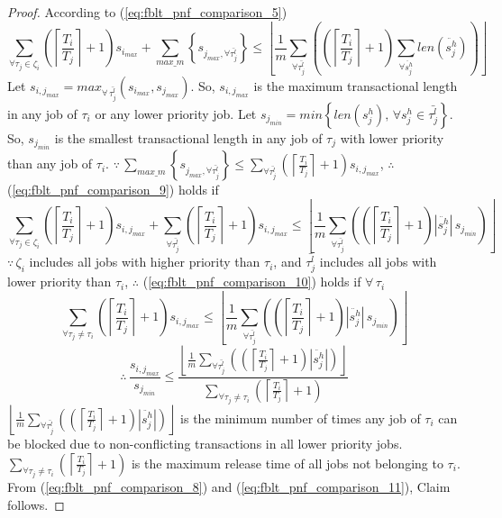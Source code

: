 \documentclass[prodmode,acmtecs]{acmsmall}
\begin{document}
\begin{compactenum}
\begin{proof}
According to (\ref{eq:fblt_pnf_comparison_5}) 
\begin{equation}
\sum_{\forall\tau_{j}\in\zeta_{i}}\left(\left\lceil \frac{T_{i}}{T_{j}}\right\rceil +1\right)s_{i_{max}}+\sum_{max\_m}\left\{ s_{j_{max},\forall\bar{\tau_{j}^{l}}}\right\} \le\left\lfloor \frac{1}{m}\sum_{\forall\bar{\tau_{j}^{l}}}\left(\left(\left\lceil \frac{T_{i}}{T_{j}}\right\rceil +1\right)\sum_{\forall\ddot{s_{j}^{h}}}len\left(\ddot{s_{j}^{h}}\right)\right)\right\rfloor \label{eq:fblt_pnf_comparison_9}
\end{equation}
Let $s_{i,j_{max}}=max_{\forall\,\bar{\tau_{j}^{l}}}(s_{i_{max}},s_{j_{max}})$.
So, $s_{i,j_{max}}$ is the maximum transactional length in any job
of $\tau_{i}$ or any lower priority job. Let $s_{j_{min}}=min\left\{ len(s_{j}^{h}),\,\forall s_{j}^{h}\in\bar{\tau_{j}^{l}}\right\} $.
So, $s_{j_{min}}$ is the smallest transactional length in any job
of $\tau_{j}$ with lower priority than any job of $\tau_{i}$. $\because\,\sum_{max\_m}\left\{ s_{j_{max},\forall\bar{\tau_{j}^{l}}}\right\} \le\sum_{\forall\bar{\tau_{j}^{l}}}\left(\left\lceil \frac{T_{i}}{T_{j}}\right\rceil +1\right)s_{i,j_{max}}$,
$\therefore$ (\ref{eq:fblt_pnf_comparison_9}) holds if 
\begin{equation}
\sum_{\forall\tau_{j}\in\zeta_{i}}\left(\left\lceil \frac{T_{i}}{T_{j}}\right\rceil +1\right)s_{i,j_{max}}+\sum_{\forall\bar{\tau_{j}^{l}}}\left(\left\lceil \frac{T_{i}}{T_{j}}\right\rceil +1\right)s_{i,j_{max}}\le\left\lfloor \frac{1}{m}\sum_{\forall\bar{\tau_{j}^{l}}}\left(\left(\left\lceil \frac{T_{i}}{T_{j}}\right\rceil +1\right)|\ddot{s_{j}^{h}}|\, s_{j_{min}}\right)\right\rfloor \label{eq:fblt_pnf_comparison_10}
\end{equation}
$\because\,\zeta_{i}$ includes all jobs with higher priority than
$\tau_{i}$, and $\bar{\tau_{j}^{l}}$ includes all jobs with lower
priority than $\tau_{i}$, $\therefore$ (\ref{eq:fblt_pnf_comparison_10})
holds if $\forall\,\tau_{i}$ 
\[
\sum_{\forall\tau_{j}\neq\tau_{i}}\left(\left\lceil \frac{T_{i}}{T_{j}}\right\rceil +1\right)s_{i,j_{max}}\le\left\lfloor \frac{1}{m}\sum_{\forall\bar{\tau_{j}^{l}}}\left(\left(\left\lceil \frac{T_{i}}{T_{j}}\right\rceil +1\right)|\ddot{s_{j}^{h}}|\, s_{j_{min}}\right)\right\rfloor 
\]
\begin{equation}
\therefore\,\frac{s_{i,j_{max}}}{s_{j_{min}}}\le\frac{\left\lfloor \frac{1}{m}\sum_{\forall\bar{\tau_{j}^{l}}}\left(\left(\left\lceil \frac{T_{i}}{T_{j}}\right\rceil +1\right)|\ddot{s_{j}^{h}}|\right)\right\rfloor }{\sum_{\forall\tau_{j}\neq\tau_{i}}\left(\left\lceil \frac{T_{i}}{T_{j}}\right\rceil +1\right)}\label{eq:fblt_pnf_comparison_11}
\end{equation}
$\left\lfloor \frac{1}{m}\sum_{\forall\bar{\tau_{j}^{l}}}\left(\left(\left\lceil \frac{T_{i}}{T_{j}}\right\rceil +1\right)|\ddot{s_{j}^{h}}|\right)\right\rfloor $
is the minimum number of times any job of $\tau_{i}$ can be blocked
due to non-conflicting transactions in all lower priority jobs. $\sum_{\forall\tau_{j}\neq\tau_{i}}\left(\left\lceil \frac{T_{i}}{T_{j}}\right\rceil +1\right)$
is the maximum release time of all jobs not belonging to $\tau_{i}$.
From (\ref{eq:fblt_pnf_comparison_8}) and (\ref{eq:fblt_pnf_comparison_11}),
Claim follows.


\end{proof}
\end{compactenum}
\end{document}
